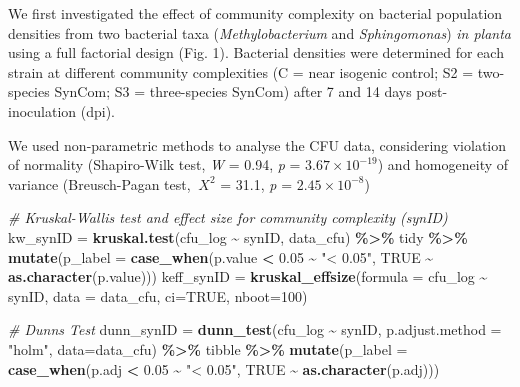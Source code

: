 \documentclass[
]{article}
\newenvironment{Shaded}{\begin{snugshade}}{\end{snugshade}}
\newcommand{\AttributeTok}[1]{\textcolor[rgb]{0.13,0.29,0.53}{#1}}
\newcommand{\CommentTok}[1]{\textcolor[rgb]{0.56,0.35,0.01}{\textit{#1}}}
\newcommand{\ConstantTok}[1]{\textcolor[rgb]{0.56,0.35,0.01}{#1}}
\newcommand{\DecValTok}[1]{\textcolor[rgb]{0.00,0.00,0.81}{#1}}
\newcommand{\FloatTok}[1]{\textcolor[rgb]{0.00,0.00,0.81}{#1}}
\newcommand{\FunctionTok}[1]{\textcolor[rgb]{0.13,0.29,0.53}{\textbf{#1}}}
\newcommand{\NormalTok}[1]{#1}
\newcommand{\OtherTok}[1]{\textcolor[rgb]{0.56,0.35,0.01}{#1}}
\newcommand{\SpecialCharTok}[1]{\textcolor[rgb]{0.81,0.36,0.00}{\textbf{#1}}}
\newcommand{\StringTok}[1]{\textcolor[rgb]{0.31,0.60,0.02}{#1}}
\begin{document}
We first investigated the effect of community complexity on bacterial
population densities from two bacterial taxa (\emph{Methylobacterium}
and \emph{Sphingomonas}) \emph{in planta} using a full factorial design
(Fig. 1). Bacterial densities were determined for each strain at
different community complexities (C = near isogenic control; S2 =
two-species SynCom; S3 = three-species SynCom) after 7 and 14 days
post-inoculation (dpi).

We used non-parametric methods to analyse the CFU data, considering
violation of normality (Shapiro-Wilk test, \emph{W} = 0.94, \emph{p} =
\ensuremath{3.67\times 10^{-19}}) and homogeneity of variance
(Breusch-Pagan test, \(\ X^{2}\) = 31.1, \emph{p} =
\ensuremath{2.45\times 10^{-8}})

\begin{Shaded}
\begin{Highlighting}[]
\CommentTok{\# Kruskal{-}Wallis test and effect size for community complexity (synID)}
\NormalTok{kw\_synID }\OtherTok{=} \FunctionTok{kruskal.test}\NormalTok{(cfu\_log }\SpecialCharTok{\textasciitilde{}}\NormalTok{ synID, data\_cfu) }\SpecialCharTok{\%\textgreater{}\%}\NormalTok{ tidy }\SpecialCharTok{\%\textgreater{}\%} 
    \FunctionTok{mutate}\NormalTok{(}\AttributeTok{p\_label =} \FunctionTok{case\_when}\NormalTok{(p.value }\SpecialCharTok{\textless{}} \FloatTok{0.05} \SpecialCharTok{\textasciitilde{}} \StringTok{"\textless{} 0.05"}\NormalTok{, }\ConstantTok{TRUE} \SpecialCharTok{\textasciitilde{}} \FunctionTok{as.character}\NormalTok{(p.value)))}
\NormalTok{keff\_synID }\OtherTok{=} \FunctionTok{kruskal\_effsize}\NormalTok{(}\AttributeTok{formula =}\NormalTok{ cfu\_log }\SpecialCharTok{\textasciitilde{}}\NormalTok{ synID, }\AttributeTok{data =}\NormalTok{ data\_cfu, }\AttributeTok{ci=}\ConstantTok{TRUE}\NormalTok{, }\AttributeTok{nboot=}\DecValTok{100}\NormalTok{)}

\CommentTok{\# Dunn\textquotesingle{}s Test}
\NormalTok{dunn\_synID }\OtherTok{=} \FunctionTok{dunn\_test}\NormalTok{(cfu\_log }\SpecialCharTok{\textasciitilde{}}\NormalTok{ synID, }\AttributeTok{p.adjust.method =} \StringTok{"holm"}\NormalTok{, }\AttributeTok{data=}\NormalTok{data\_cfu) }\SpecialCharTok{\%\textgreater{}\%}\NormalTok{ tibble }\SpecialCharTok{\%\textgreater{}\%} 
    \FunctionTok{mutate}\NormalTok{(}\AttributeTok{p\_label =} \FunctionTok{case\_when}\NormalTok{(p.adj }\SpecialCharTok{\textless{}} \FloatTok{0.05} \SpecialCharTok{\textasciitilde{}} \StringTok{"\textless{} 0.05"}\NormalTok{, }\ConstantTok{TRUE} \SpecialCharTok{\textasciitilde{}} \FunctionTok{as.character}\NormalTok{(p.adj)))}


\end{Highlighting}
\end{Shaded}
\end{document}

